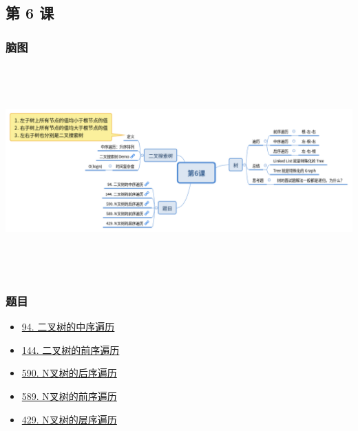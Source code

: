 \subsection{第 6 课}

\subsubsection{脑图}

\includegraphics[width=170mm,height=80mm]{images/第6课.png}

\subsubsection{题目}

\begin{itemize}
  \item \hyperref[leetcode:94]{94. 二叉树的中序遍历}
  \item \hyperref[leetcode:144]{144. 二叉树的前序遍历}
  \item \hyperref[leetcode:590]{590. N叉树的后序遍历}
  \item \hyperref[leetcode:589]{589. N叉树的前序遍历}
  \item \hyperref[leetcode:429]{429. N叉树的层序遍历}
\end{itemize}
